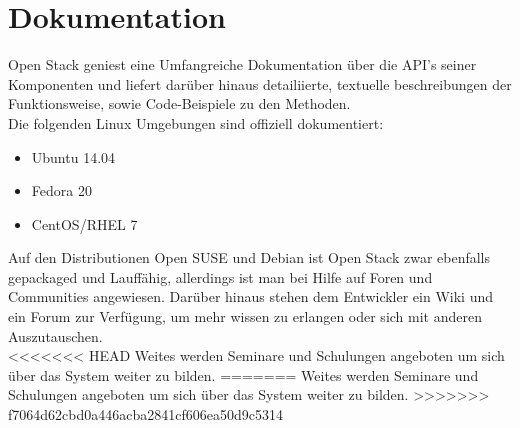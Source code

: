 \documentclass[a4paper,nochapterprefix,english,12pt]{scrreprt}
\begin{document}
\section{Dokumentation}
Open Stack geniest eine Umfangreiche Dokumentation über die API's seiner Komponenten und liefert darüber hinaus detailiierte, textuelle beschreibungen der Funktionsweise, sowie Code-Beispiele zu den Methoden.\\
Die folgenden Linux Umgebungen sind offiziell dokumentiert:
\begin{itemize}
	\item Ubuntu 14.04
	\item Fedora 20
	\item CentOS/RHEL 7
\end{itemize}
Auf den Distributionen Open SUSE und Debian ist Open Stack zwar ebenfalls gepackaged und Lauffähig, allerdings ist man bei Hilfe auf Foren und Communities angewiesen.
Darüber hinaus stehen dem Entwickler ein Wiki und ein Forum zur Verfügung, um mehr wissen zu erlangen oder sich mit anderen Auszutauschen.\\
<<<<<<< HEAD
Weites werden Seminare und Schulungen angeboten um sich über das System weiter zu bilden. \cite{OS-Docs}
=======
Weites werden Seminare und Schulungen angeboten um sich über das System weiter zu bilden. 
>>>>>>> f7064d62cbd0a446acba2841cf606ea50d9c5314
\end{document}

